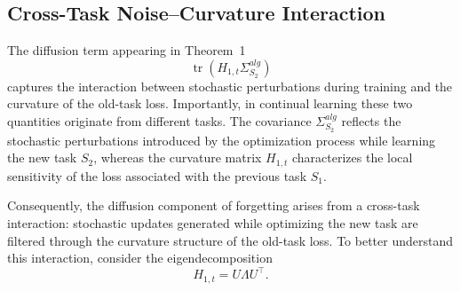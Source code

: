 \documentclass{article}
\begin{document}


\subsection{Cross-Task Noise--Curvature Interaction}

The diffusion term appearing in Theorem~1
\begin{equation}
\operatorname{tr}(H_{1,t}\Sigma_{S_2}^{alg})
\end{equation}
captures the interaction between stochastic perturbations during training and the curvature of the old-task loss.
Importantly, in continual learning these two quantities originate from different tasks.
The covariance $\Sigma_{S_2}^{alg}$ reflects the stochastic perturbations introduced by the optimization process while learning the new task $S_2$, whereas the curvature matrix $H_{1,t}$ characterizes the local sensitivity of the loss associated with the previous task $S_1$.

Consequently, the diffusion component of forgetting arises from a cross-task interaction: stochastic updates generated while optimizing the new task are filtered through the curvature structure of the old-task loss.
To better understand this interaction, consider the eigendecomposition
\begin{equation}
H_{1,t} = U \Lambda U^\top .
\end{equation}
\end{document}
